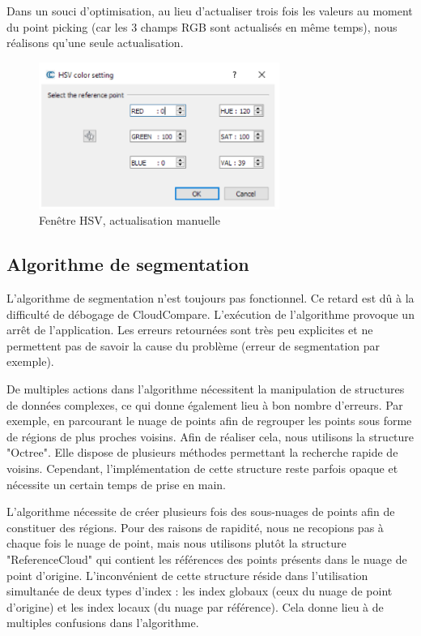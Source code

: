 \documentclass[12pt,titlepage,french]{article}
\begin{document}
Dans un souci d'optimisation, au lieu d'actualiser trois fois les valeurs au moment du point picking (car les 3 champs RGB sont actualisés en même temps), nous réalisons qu'une seule actualisation.

\begin{figure}[H]
 \caption{\label{} Fenêtre HSV, actualisation manuelle}
 \begin{center}
 \includegraphics[width=0.7\textwidth]{./img/hsv.PNG}
  \end{center}
\end{figure}

\subsection{Algorithme de segmentation}


L'algorithme de segmentation n'est toujours pas fonctionnel. Ce retard est dû à la difficulté de débogage de CloudCompare. L'exécution de l'algorithme provoque un arrêt de l'application. Les erreurs retournées sont très peu explicites et ne permettent pas de savoir la cause du problème (erreur de segmentation par exemple). \newline

De multiples actions dans l'algorithme nécessitent la manipulation de structures de données complexes, ce qui donne également lieu à bon nombre d'erreurs. Par exemple, en parcourant le nuage de points afin de regrouper les points sous forme de régions de plus proches voisins. Afin de réaliser cela, nous utilisons la structure "Octree". Elle dispose de plusieurs méthodes permettant la recherche rapide de voisins. Cependant, l'implémentation de cette structure reste parfois opaque et nécessite un certain temps de prise en main. \newline

L'algorithme nécessite de créer plusieurs fois des sous-nuages de points afin de constituer des régions. Pour des raisons de rapidité, nous ne recopions pas à chaque fois le nuage de point, mais nous utilisons plutôt la structure "ReferenceCloud" qui contient les références des points présents dans le nuage de point d'origine. L'inconvénient de cette structure réside dans l'utilisation simultanée de deux types d'index : les index globaux (ceux du nuage de point d'origine) et les index locaux (du nuage par référence). Cela donne lieu à de multiples confusions dans l'algorithme.\newline
\end{document}
